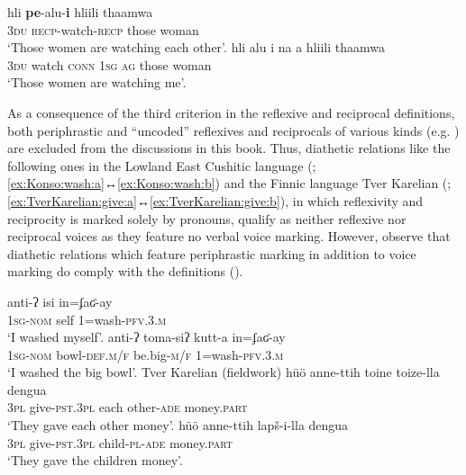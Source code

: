\ea {} \citep[1490]{bril:2007}
\ea\label{ex:Nelemwa:watch:a}
	\gll	hli \textbf{pe}-alu-\textbf{i} hliili thaamwa	\\
			\textsc{3du} \textsc{recp}-watch-\textsc{recp} those woman \\
	\glt	‘Those women are watching each other’.
\ex\label{ex:Nelemwa:watch:b}
	\gll	hli alu i na a hliili thaamwa \\
			\textsc{3du} watch \textsc{conn} \textsc{1sg} \textsc{ag} those woman \\
	\glt	‘Those women are watching me’.
	\z 
\z

As a consequence of the third criterion in the reflexive and reciprocal definitions, both periphrastic and “uncoded” reflexives and reciprocals of various kinds (e.g. \citealt[151ff., 195ff.]{zuniga:kittila:2019}) are excluded from the discussions in this book. Thus, diathetic relations like the following ones in the Lowland East Cushitic language  (; \ref{ex:Konso:wash:a}↔\ref{ex:Konso:wash:b}) and the Finnic language Tver Karelian (; \ref{ex:TverKarelian:give:a}↔\ref{ex:TverKarelian:give:b}), in which reflexivity and reciprocity is marked solely by pronouns, qualify as neither reflexive nor reciprocal voices as they feature no verbal voice marking. However, observe that diathetic relations which feature periphrastic marking in addition to voice marking do comply with the definitions ().

\ea {} \citep[51, 134]{orkaydo:2013}
\ea\label{ex:Konso:wash:a}
	\gll	anti-ʔ				isi		in=ʄaʛ-ay				\\
			\textsc{1sg-nom} 	self	1=wash-\textsc{pfv.3.m}	\\
	\glt	‘I washed myself’.
\ex\label{ex:Konso:wash:b}
	\gll	anti-ʔ toma-siʔ kutt-a in=ʄaʛ-ay \\
			\textsc{1sg-nom} bowl-\textsc{def.m/f} be.big-\textsc{m/f} 1=wash-\textsc{pfv.3.m} \\
	\glt	‘I washed the big bowl’.
	\z 
\z
\ea Tver Karelian (fieldwork)
\ea\label{ex:TverKarelian:give:a}
	\gll	hüö anne-ttih {toine toize-lla} dengua \\
			\textsc{3pl} give-\textsc{pst.3pl} {each other-\textsc{ade}} money.\textsc{part}	\\
	\glt	‘They gave each other money’.
\ex\label{ex:TverKarelian:give:b}
	\gll	hüö anne-ttih lapš-i-lla dengua \\
			\textsc{3pl} give-\textsc{pst.3pl} child-\textsc{pl-ade} money.\textsc{part} \\
	\glt	‘They gave the children money’.
	\z 
\z

